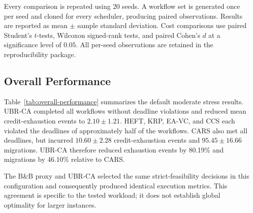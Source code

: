 Every comparison is repeated using 20 seeds. A workflow set is
generated once per seed and cloned for every scheduler, producing
paired observations. Results are reported as mean $\pm$ sample
standard deviation. Cost comparisons use paired Student's $t$-tests,
Wilcoxon signed-rank tests, and paired Cohen's $d$ at a significance
level of $0.05$. All per-seed observations are retained in the
reproducibility package.

\subsection{Overall Performance}
\label{subsec:overall}

Table~\ref{tab:overall-performance} summarizes the default moderate
stress results. UBR-CA completed all workflows without deadline
violations and reduced mean credit-exhaustion events to
$2.10\pm1.21$. HEFT, KRP, EA-VC, and CCS each violated the deadlines
of approximately half of the workflows. CARS also met all deadlines,
but incurred $10.60\pm2.28$ credit-exhaustion events and
$95.45\pm16.66$ migrations. UBR-CA therefore reduced exhaustion
events by 80.19\% and migrations by 46.10\% relative to CARS.

The B\&B proxy and UBR-CA selected the same strict-feasibility
decisions in this configuration and consequently produced identical
execution metrics. This agreement is specific to the tested workload;
it does not establish global optimality for larger instances.

\begin{table}[t]
\centering
\caption{Overall performance under moderate credit stress
(mean $\pm$ standard deviation over 20 paired seeds).}
\label{tab:overall-performance}
\scriptsize
{}
\end{table}

